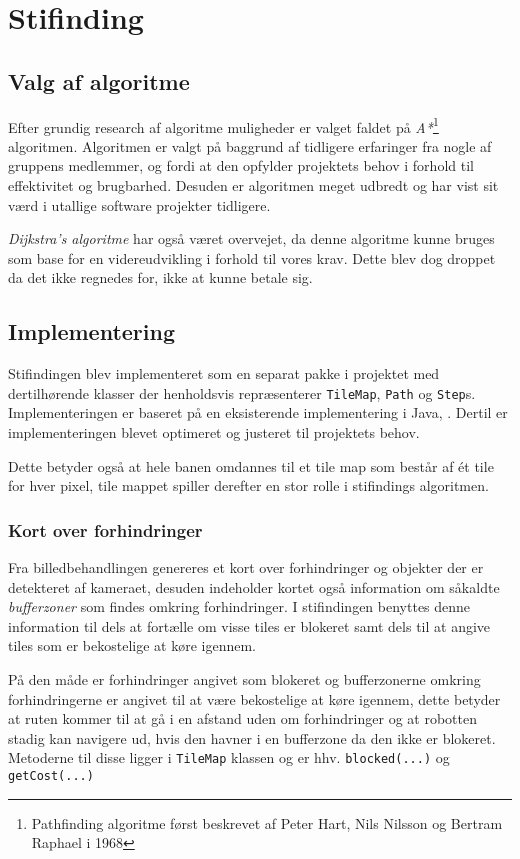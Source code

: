 \chapter{Stifinding}

\section{Valg af algoritme}
Efter grundig research af algoritme muligheder er valget faldet på \textit{A*}\footnote{Pathfinding algoritme først beskrevet af  Peter Hart, Nils Nilsson og Bertram Raphael i 1968} algoritmen.
Algoritmen er valgt på baggrund af tidligere erfaringer fra nogle af gruppens medlemmer, og fordi at den opfylder projektets behov i forhold til effektivitet og brugbarhed. Desuden er algoritmen meget udbredt og har vist sit værd i utallige software projekter tidligere.

\textit{Dijkstra's algoritme} har også været overvejet, da denne algoritme kunne bruges som base for en videreudvikling i forhold til vores krav. Dette blev dog droppet da det ikke regnedes for, ikke at kunne betale sig.

\section{Implementering}
Stifindingen blev implementeret som en separat pakke i projektet med dertilhørende klasser der henholdsvis repræsenterer \texttt{TileMap}, \texttt{Path} og \texttt{Step}s. Implementeringen er baseret på en eksisterende implementering i Java, \citet{astar}.
Dertil er implementeringen blevet optimeret og justeret til projektets behov.

Dette betyder også at hele banen omdannes til et tile map som består af ét tile for hver pixel, tile mappet spiller derefter en stor rolle i stifindings algoritmen.

\subsection{Kort over forhindringer}
Fra billedbehandlingen genereres et kort over forhindringer og objekter der er detekteret af kameraet, desuden indeholder kortet også information om såkaldte \textit{bufferzoner} som findes omkring forhindringer. I stifindingen benyttes denne information til dels at fortælle om visse tiles er blokeret samt dels til at angive tiles som er bekostelige at køre igennem.

På den måde er forhindringer angivet som blokeret og bufferzonerne omkring forhindringerne er angivet til at være bekostelige at køre igennem, dette betyder at ruten kommer til at gå i en afstand uden om forhindringer og at robotten stadig kan navigere ud, hvis den havner i en bufferzone da den ikke er blokeret. Metoderne til disse ligger i \texttt{TileMap} klassen og er hhv. \texttt{blocked(...)} og \texttt{getCost(...)}

